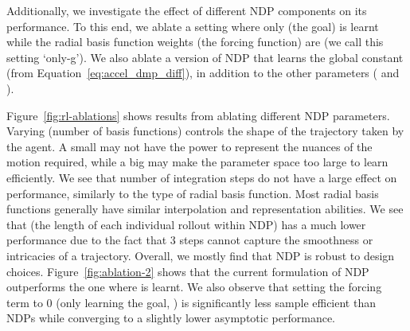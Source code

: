 \documentclass{article}
\newcommand{\our}{NDP\xspace}
\newcommand{\ours}{NDPs\xspace}
\begin{document}
Additionally, we investigate the effect of different \our components on its performance. To this end, we ablate a setting where only  (the goal) is learnt while the radial basis function weights (the forcing function) are  (we call this setting `only-g'). We also ablate a version of \our that learns the global constant  (from Equation~\ref{eq:accel_dmp_diff}), in addition to the other parameters ( and ).

Figure~\ref{fig:rl-ablations} shows results from ablating different \our parameters. Varying  (number of basis functions) controls the shape of the trajectory taken by the agent. A small  may not have the power to represent the nuances of the motion required, while a big  may make the parameter space too large to learn efficiently. We see that number of integration steps do not have a large effect on performance, similarly to the type of radial basis function. Most radial basis functions generally have similar interpolation and representation abilities. We see that  (the length of each individual rollout within \our) has a much lower performance due to the fact that 3 steps cannot capture the smoothness or intricacies of a trajectory. Overall, we mostly find that \our is robust to design choices.  Figure~\ref{fig:ablation-2} shows that the current formulation of \our outperforms the one where  is learnt. We also observe that setting the forcing term to 0 (only learning the goal, ) is significantly less sample efficient than \ours while converging to a slightly lower asymptotic performance.
\end{document}

